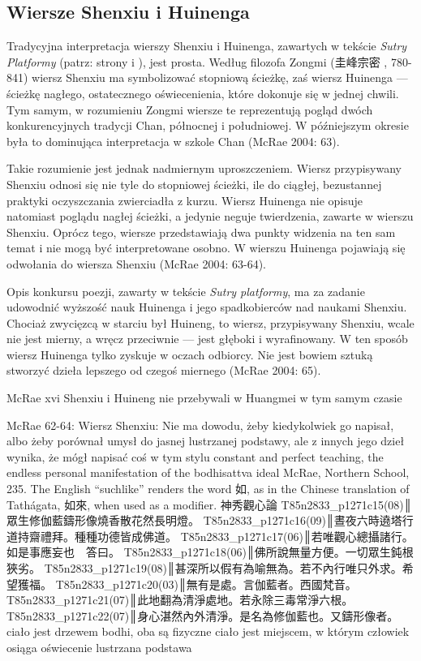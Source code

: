 \subsection{Wiersze Shenxiu i Huinenga}
Tradycyjna interpretacja wierszy Shenxiu i Huinenga, zawartych w tekście \textit{Sutry Platformy} (patrz: strony \pageref{ShenxiuVerse} i \pageref{HuinengVerse}), jest prosta. Według filozofa Zongmi (圭峰宗密 , 780-841) wiersz Shenxiu ma symbolizować stopniową ścieżkę, zaś wiersz Huinenga --- ścieżkę nagłego, ostatecznego oświecenienia, które dokonuje się w jednej chwili. Tym samym, w rozumieniu Zongmi wiersze te reprezentują pogląd dwóch konkurencyjnych tradycji Chan, północnej i południowej. W późniejszym okresie była to dominująca interpretacja w szkole Chan (McRae 2004: 63).

Takie rozumienie jest jednak nadmiernym uproszczeniem. Wiersz przypisywany Shenxiu odnosi się nie tyle do stopniowej ścieżki, ile do ciągłej, bezustannej praktyki oczyszczania zwierciadła z kurzu. Wiersz Huinenga nie opisuje natomiast poglądu nagłej ścieżki, a jedynie neguje twierdzenia, zawarte w wierszu Shenxiu. Oprócz tego, wiersze przedstawiają dwa punkty widzenia na ten sam temat i nie mogą być interpretowane osobno. W wierszu Huinenga pojawiają się odwołania do wiersza Shenxiu (McRae 2004: 63-64).

Opis konkursu poezji, zawarty w tekście \textit{Sutry platformy}, ma za zadanie udowodnić wyższość nauk Huinenga i jego spadkobierców nad naukami Shenxiu. Chociaż zwycięzcą w starciu był Huineng, to wiersz, przypisywany Shenxiu, wcale nie jest mierny, a wręcz przeciwnie --- jest głęboki i wyrafinowany. W ten sposób wiersz Huinenga tylko zyskuje w oczach odbiorcy. Nie jest bowiem sztuką stworzyć dzieła lepszego od czegoś miernego (McRae 2004: 65).

McRae xvi
Shenxiu i Huineng nie przebywali w Huangmei w tym samym czasie

McRae 62-64:
Wiersz Shenxiu:
Nie ma dowodu, żeby kiedykolwiek go napisał, albo żeby porównał umysł do jasnej lustrzanej podstawy, ale z innych jego dzieł wynika, że mógł napisać coś w tym stylu
constant and perfect teaching, the endless personal manifestation of the
bodhisattva ideal
McRae, Northern School, 235. The English “suchlike'' renders the word 如, as in the Chinese translation of Tathágata, 如來, when used as a modifier.
神秀觀心論
T85n2833_p1271c15(08)║眾生修伽藍鑄形像燒香散花然長明燈。
T85n2833_p1271c16(09)║晝夜六時遶塔行道持齋禮拜。種種功德皆成佛道。
T85n2833_p1271c17(06)║若唯觀心總攝諸行。如是事應妄也　答曰。
T85n2833_p1271c18(06)║佛所說無量方便。一切眾生鈍根狹劣。
T85n2833_p1271c19(08)║甚深所以假有為喻無為。若不內行唯只外求。希望獲福。
T85n2833_p1271c20(03)║無有是處。言伽藍者。西國梵音。
T85n2833_p1271c21(07)║此地翻為清淨處地。若永除三毒常淨六根。
T85n2833_p1271c22(07)║身心湛然內外清淨。是名為修伽藍也。又鑄形像者。
ciało jest drzewem bodhi, oba są fizyczne
ciało jest miejscem, w którym człowiek osiąga oświecenie
lustrzana podstawa

